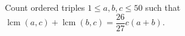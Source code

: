 Count ordered triples $1\le a,b,c\le50$ such that $\operatorname{lcm}(a,c)+\operatorname{lcm}(b,c)=\dfrac{26}{27}c(a+b)$.
